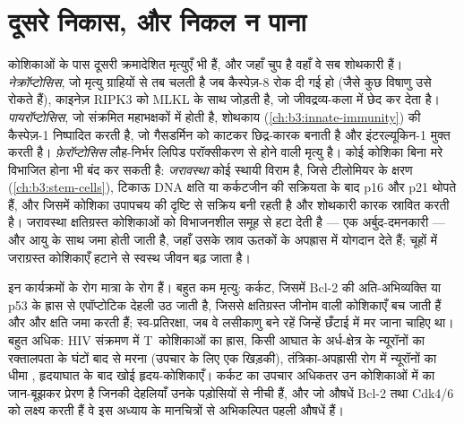 \section{दूसरे निकास, और निकल न पाना}

\begin{definition}[नियमित परिगलन और जरावस्था]\label{def:b3:cell-cycle-apoptosis:other}
कोशिकाओं के पास दूसरी क्रमादेशित मृत्युएँ भी हैं, और जहाँ 
चुप है वहाँ वे सब शोथकारी हैं। \emph{नेक्रॉप्टोसिस}, जो मृत्यु
ग्राहियों से तब चलती है जब कैस्पेज़-8 रोक दी गई हो (जैसे कुछ विषाणु उसे
रोकते हैं), काइनेज़ RIPK3 को MLKL के साथ जोड़ती है, जो जीवद्रव्य-कला में
छेद कर देता है। \emph{पायरॉप्टोसिस}, जो संक्रमित महाभक्षकों में होती
है, शोथकाय (\cref{ch:b3:innate-immunity}) की कैस्पेज़-1 निष्पादित करती
है, जो गैसडर्मिन को काटकर छिद्र-कारक बनाती है और इंटरल्यूकिन-1 मुक्त
करती है। \emph{फ़ेरॉप्टोसिस} लौह-निर्भर लिपिड परॉक्सीकरण से होने वाली
मृत्यु है। कोई कोशिका बिना मरे विभाजित होना भी बंद कर सकती है:
\emph{जरावस्था} कोई स्थायी विराम है, जिसे टीलोमियर के क्षरण
(\cref{ch:b3:stem-cells}), टिकाऊ DNA क्षति या कर्कटजीन की सक्रियता के
बाद p16 और p21 थोपते हैं, और जिसमें कोशिका उपापचय की दृष्टि से सक्रिय
बनी रहती है और शोथकारी कारक स्रावित करती है। जरावस्था क्षतिग्रस्त
कोशिकाओं को विभाजनशील समूह से हटा देती है --- एक अर्बुद-दमनकारी --- और
आयु के साथ जमा होती जाती है, जहाँ उसके स्राव ऊतकों के अपह्रास में
योगदान देते हैं; चूहों में जराग्रस्त कोशिकाएँ हटाने से स्वस्थ जीवन बढ़
जाता है।
\end{definition}

\begin{remark}[बहुत कम और बहुत अधिक]\label{rem:b3:cell-cycle-apoptosis:disease}
इन कार्यक्रमों के रोग मात्रा के रोग हैं। बहुत कम मृत्यु:
कर्कट, जिसमें Bcl-2 की अति-अभिव्यक्ति या p53 के ह्रास से
एपॉप्टोटिक देहली उठ जाती है, जिससे क्षतिग्रस्त जीनोम वाली कोशिकाएँ बच
जाती हैं और और क्षति जमा करती हैं; स्व-प्रतिरक्षा, जब वे लसीकाणु बने
रहें जिन्हें छँटाई में मर जाना चाहिए था। बहुत अधिक: HIV संक्रमण में
T~कोशिकाओं का ह्रास, किसी आघात के अर्ध-क्षेत्र के न्यूरॉनों का
रक्तालपता के घंटों बाद  से मरना (उपचार के लिए एक खिड़की),
तंत्रिका-अपह्रासी रोग में न्यूरॉनों का धीमा , हृदयाघात के
बाद खोई हृदय-कोशिकाएँ। कर्कट का उपचार अधिकतर उन कोशिकाओं में
 का जान-बूझकर प्रेरण है जिनकी देहलियाँ उनके पड़ोसियों से नीची
हैं, और जो औषधें Bcl-2 तथा Cdk4/6 को लक्ष्य करती हैं वे इस अध्याय के
मानचित्रों से अभिकल्पित पहली औषधें हैं।
\end{remark}

